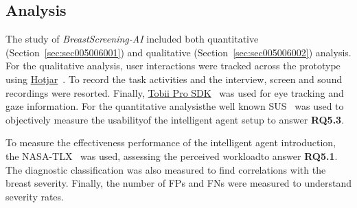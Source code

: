 

\subsection{Analysis}
\label{sec:sec005005003}

The study of {\it BreastScreening-AI} included both quantitative (Section~\ref{sec:sec005006001}) and qualitative (Section~\ref{sec:sec005006002}) analysis.
For the qualitative analysis\footnotemark[23], user interactions were tracked across the prototype using \href{https://www.hotjar.com/}{Hotjar}~\cite{liikkanen2017data}.
To record the task activities and the interview, screen and sound recordings were resorted.
Finally, \href{https://www.tobiipro.com/product-listing/tobii-pro-sdk/}{Tobii Pro SDK}~\cite{chatelain2018evaluation} was used for eye tracking and gaze information.
For the quantitative analysis\footnotemark[24] the well known \ac{SUS}~\cite{Tyllinen:2016:WNN:2858036.2858570} was used to objectively measure the usability\footnotemark[25] of the intelligent agent setup to answer {\bf RQ5.3}.

To measure the effectiveness performance of the intelligent agent introduction, the \ac{NASA-TLX}~\cite{ramkumar2017using, grier2015high} was used, assessing the perceived workload\footnotemark[26] to answer {\bf RQ5.1}.
The diagnostic classification was also measured to find correlations with the breast severity.
Finally, the number of \acp{FP} and \acp{FN} were measured to understand severity rates.


